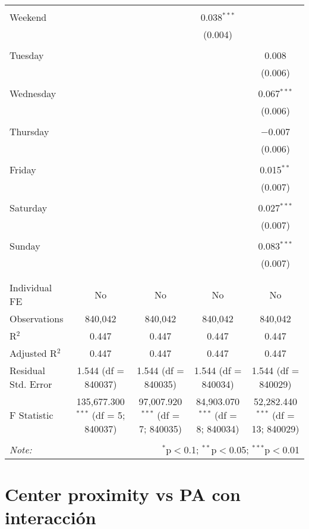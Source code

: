 \documentclass[
]{article}
\begin{document}
\begin{table}[!htbp]
{\begin{tabular}{@{\extracolsep{5pt}}lcccc}
  & & & & \\ 
 Weekend &  &  & 0.038$^{***}$ &  \\ 
  &  &  & (0.004) &  \\ 
  & & & & \\ 
 Tuesday &  &  &  & 0.008 \\ 
  &  &  &  & (0.006) \\ 
  & & & & \\ 
 Wednesday &  &  &  & 0.067$^{***}$ \\ 
  &  &  &  & (0.006) \\ 
  & & & & \\ 
 Thursday &  &  &  & $-$0.007 \\ 
  &  &  &  & (0.006) \\ 
  & & & & \\ 
 Friday &  &  &  & 0.015$^{**}$ \\ 
  &  &  &  & (0.007) \\ 
  & & & & \\ 
 Saturday &  &  &  & 0.027$^{***}$ \\ 
  &  &  &  & (0.007) \\ 
  & & & & \\ 
 Sunday &  &  &  & 0.083$^{***}$ \\ 
  &  &  &  & (0.007) \\ 
  & & & & \\ 
\hline \\[-1.8ex] 
Individual FE & No & No & No & No \\ 
Observations & 840,042 & 840,042 & 840,042 & 840,042 \\ 
R$^{2}$ & 0.447 & 0.447 & 0.447 & 0.447 \\ 
Adjusted R$^{2}$ & 0.447 & 0.447 & 0.447 & 0.447 \\ 
Residual Std. Error & 1.544 (df = 840037) & 1.544 (df = 840035) & 1.544 (df = 840034) & 1.544 (df = 840029) \\ 
F Statistic & 135,677.300$^{***}$ (df = 5; 840037) & 97,007.920$^{***}$ (df = 7; 840035) & 84,903.070$^{***}$ (df = 8; 840034) & 52,282.440$^{***}$ (df = 13; 840029) \\ 
\hline 
\hline \\[-1.8ex] 
\textit{Note:}  & \multicolumn{4}{r}{$^{*}$p$<$0.1; $^{**}$p$<$0.05; $^{***}$p$<$0.01} \\ 
\end{tabular}
} 
\end{table} 
\newpage
\section{Center proximity vs PA con interacción}
\end{document}
